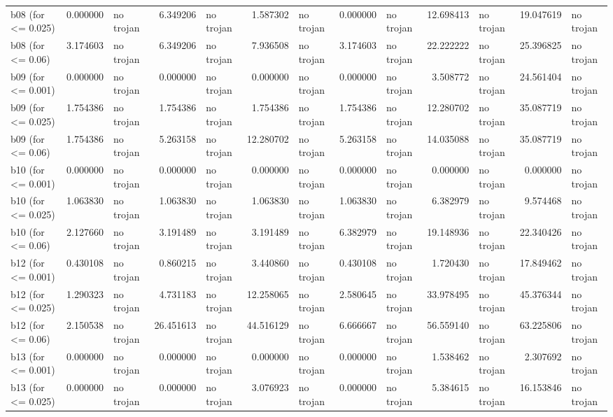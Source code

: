 \begin{tabular}{lrlrlrlrlrlrl}
b08
(for <= 0.025) & 0.000000 & no trojan & 6.349206 & no trojan & 1.587302 & no trojan & 0.000000 & no trojan & 12.698413 & no trojan & 19.047619 & no trojan \\
b08
(for <= 0.06) & 3.174603 & no trojan & 6.349206 & no trojan & 7.936508 & no trojan & 3.174603 & no trojan & 22.222222 & no trojan & 25.396825 & no trojan \\
b09
(for <= 0.001) & 0.000000 & no trojan & 0.000000 & no trojan & 0.000000 & no trojan & 0.000000 & no trojan & 3.508772 & no trojan & 24.561404 & no trojan \\
b09
(for <= 0.025) & 1.754386 & no trojan & 1.754386 & no trojan & 1.754386 & no trojan & 1.754386 & no trojan & 12.280702 & no trojan & 35.087719 & no trojan \\
b09
(for <= 0.06) & 1.754386 & no trojan & 5.263158 & no trojan & 12.280702 & no trojan & 5.263158 & no trojan & 14.035088 & no trojan & 35.087719 & no trojan \\
b10
(for <= 0.001) & 0.000000 & no trojan & 0.000000 & no trojan & 0.000000 & no trojan & 0.000000 & no trojan & 0.000000 & no trojan & 0.000000 & no trojan \\
b10
(for <= 0.025) & 1.063830 & no trojan & 1.063830 & no trojan & 1.063830 & no trojan & 1.063830 & no trojan & 6.382979 & no trojan & 9.574468 & no trojan \\
b10
(for <= 0.06) & 2.127660 & no trojan & 3.191489 & no trojan & 3.191489 & no trojan & 6.382979 & no trojan & 19.148936 & no trojan & 22.340426 & no trojan \\
b12
(for <= 0.001) & 0.430108 & no trojan & 0.860215 & no trojan & 3.440860 & no trojan & 0.430108 & no trojan & 1.720430 & no trojan & 17.849462 & no trojan \\
b12
(for <= 0.025) & 1.290323 & no trojan & 4.731183 & no trojan & 12.258065 & no trojan & 2.580645 & no trojan & 33.978495 & no trojan & 45.376344 & no trojan \\
b12
(for <= 0.06) & 2.150538 & no trojan & 26.451613 & no trojan & 44.516129 & no trojan & 6.666667 & no trojan & 56.559140 & no trojan & 63.225806 & no trojan \\
b13
(for <= 0.001) & 0.000000 & no trojan & 0.000000 & no trojan & 0.000000 & no trojan & 0.000000 & no trojan & 1.538462 & no trojan & 2.307692 & no trojan \\
b13
(for <= 0.025) & 0.000000 & no trojan & 0.000000 & no trojan & 3.076923 & no trojan & 0.000000 & no trojan & 5.384615 & no trojan & 16.153846 & no trojan \\

\end{tabular}
